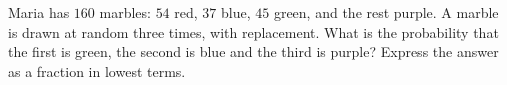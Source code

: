 Maria has $160$ marbles: $54$ red, $37$ blue, $45$ green, and the rest purple. A marble is drawn at random three times, with replacement. What is the probability that the first is green, the second is blue and the third is purple? Express the answer as a fraction in lowest terms.
